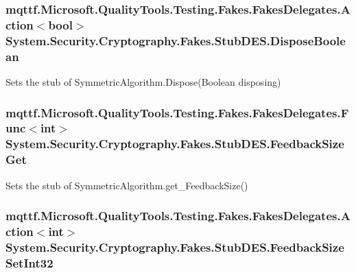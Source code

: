 \hypertarget{class_system_1_1_security_1_1_cryptography_1_1_fakes_1_1_stub_d_e_s_ab5f28d4f782fca2865804fe4abc393fe}{
\subsubsection[{Dispose\-Boolean}]{\setlength{\rightskip}{0pt plus 5cm}mqttf.\-Microsoft.\-Quality\-Tools.\-Testing.\-Fakes.\-Fakes\-Delegates.\-Action$<$bool$>$ System.\-Security.\-Cryptography.\-Fakes.\-Stub\-D\-E\-S.\-Dispose\-Boolean}}\label{class_system_1_1_security_1_1_cryptography_1_1_fakes_1_1_stub_d_e_s_ab5f28d4f782fca2865804fe4abc393fe}


Sets the stub of Symmetric\-Algorithm.\-Dispose(\-Boolean disposing)

\hypertarget{class_system_1_1_security_1_1_cryptography_1_1_fakes_1_1_stub_d_e_s_a9c1b2820311468de2230bc90555af7b0}{
\subsubsection[{Feedback\-Size\-Get}]{\setlength{\rightskip}{0pt plus 5cm}mqttf.\-Microsoft.\-Quality\-Tools.\-Testing.\-Fakes.\-Fakes\-Delegates.\-Func$<$int$>$ System.\-Security.\-Cryptography.\-Fakes.\-Stub\-D\-E\-S.\-Feedback\-Size\-Get}}\label{class_system_1_1_security_1_1_cryptography_1_1_fakes_1_1_stub_d_e_s_a9c1b2820311468de2230bc90555af7b0}


Sets the stub of Symmetric\-Algorithm.\-get\-\_\-\-Feedback\-Size()

\hypertarget{class_system_1_1_security_1_1_cryptography_1_1_fakes_1_1_stub_d_e_s_a984c099ec87adb8d95a01c62042d58c4}{
\subsubsection[{Feedback\-Size\-Set\-Int32}]{\setlength{\rightskip}{0pt plus 5cm}mqttf.\-Microsoft.\-Quality\-Tools.\-Testing.\-Fakes.\-Fakes\-Delegates.\-Action$<$int$>$ System.\-Security.\-Cryptography.\-Fakes.\-Stub\-D\-E\-S.\-Feedback\-Size\-Set\-Int32}}\label{class_system_1_1_security_1_1_cryptography_1_1_fakes_1_1_stub_d_e_s_a984c099ec87adb8d95a01c62042d58c4}


